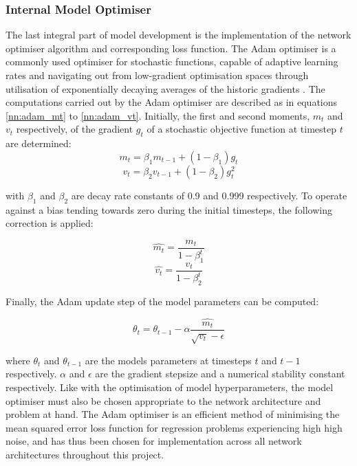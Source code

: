 \documentclass[a4paper, 10pt]{article}
\numberwithin{equation}{section}
\begin{document}
\subsubsection{Internal Model Optimiser}

The last integral part of model development is the implementation of the network optimiser algorithm and corresponding loss function. The Adam optimiser is a commonly used optimiser for stochastic functions, capable of adaptive learning rates and navigating out from low-gradient optimisation spaces through utilisation of exponentially decaying averages of the historic gradients \cite{nn:adam_optimiser}. The computations carried out by the Adam optimiser are described as in equations \ref{nn:adam_mt} to \ref{nn:adam_vt}. Initially, the first and second moments, $m_{t}$ and $v_{t}$ respectively, of the gradient $g_{t}$ of a stochastic objective function at timestep $t$ are determined:
\begin{equation}
    \label{nn:adam_mt}
    m_{t} = \beta_{1} m_{t-1} + (1 - \beta_{1})g_{t}
\end{equation}
\begin{equation}
    \label{nn:adam_vt}
    v_{t} = \beta_{2} v_{t-1} + (1 - \beta_{2})g_{t}^2
\end{equation}

with $\beta_{1}$ and $\beta_{2}$ are decay rate constants of 0.9 and 0.999 respectively. To operate against a bias tending towards zero during the initial timesteps, the following correction is applied:

\begin{equation}
    \label{nn:adam_mt}
    \hat{m_{t}} = \frac{m_{t}}{1 - \beta_{1}^{t}}
\end{equation}
\begin{equation}
    \label{nn:adam_vt}
    \hat{v_{t}} = \frac{v_{t}}{1 - \beta_{2}^{t}}
\end{equation}

Finally, the Adam update step of the model parameters can be computed:

\begin{equation}
    \label{nn:adam_update}
    \theta_{t} = \theta_{t-1} - \alpha \frac{\hat{m_{t}}}{\sqrt{v_{t}} - \epsilon}
\end{equation}

where $\theta_{t}$ and $\theta_{t-1}$ are the models parameters at timesteps $t$ and $t-1$ respectively. $\alpha$ and $\epsilon$ are the gradient stepsize and a numerical stability constant respectively. Like with the optimisation of model hyperparameters, the model optimiser must also be chosen appropriate to the network architecture and problem at hand. The Adam optimiser is an efficient method of minimising the mean squared error loss function for regression problems experiencing high high noise, and has thus been chosen for implementation across all network architectures throughout this project.\medbreak
\end{document}
